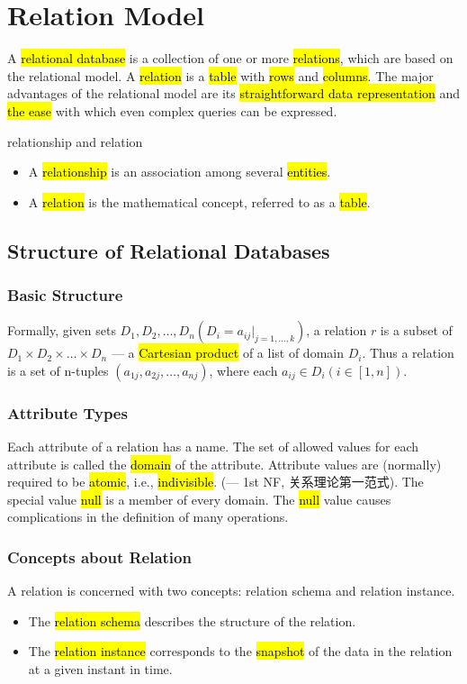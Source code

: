 \newpage
\section{Relation Model}

A \hl{relational database} is a collection of one or more \hl{relations}, which are based on the relational model. A \hl{relation} is a \hl{table} with \hl{rows} and \hl{columns}. The major advantages of the relational model are its \hl{straightforward data representation} and \hl{the ease} with which even complex queries can be expressed. 

relationship and relation
\begin{itemize}
    \item A \hl{relationship} is an association among several \hl{entities}.
    \item A \hl{relation} is the mathematical concept, referred to as a \hl{table}. 
\end{itemize}

\subsection{Structure of Relational Databases}
\subsubsection{Basic Structure}
Formally, given sets $D_1,D_2,\dots,D_n (D_i=a_{ij}|_{j=1,\dots,k})$, a relation $r$ is a subset of $D_1\times D_2\times \dots \times D_n$ --- a \hl{Cartesian product} of a list of domain $D_i$. Thus a relation is a set of n-tuples $(a_{1j},a_{2j},\dots,a_{nj})$, where each $a_{ij}\in D_i (i\in [1,n]) $. 

\subsubsection{Attribute Types}
Each attribute of a relation has a name. The set of allowed values for each attribute is called the \hl{domain} of the attribute. Attribute values are (normally) required to be \hl{atomic}, i.e., \hl{indivisible}. (--- 1st NF, 关系理论第一范式). The special value \hl{null} is a member of every domain. The \hl{null} value causes complications in the definition of many operations.

\subsubsection{Concepts about Relation}
A relation is concerned with two concepts: relation schema and relation instance.
\begin{itemize}
    \item The \hl{relation schema} describes the structure of the relation.
    \item The \hl{relation instance} corresponds to the \hl{snapshot} of the data in the relation at a given instant in time.
\end{itemize}

